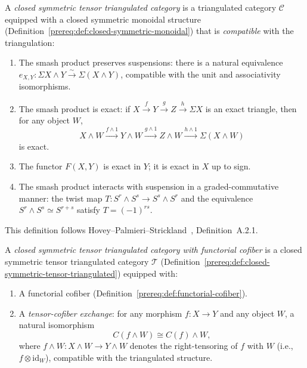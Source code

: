 \begin{definition}\label{prereq:def:closed-symmetric-tensor-triangulated}
    \leanok
    A \emph{closed symmetric tensor triangulated category} is a triangulated category $\mathcal{C}$ equipped with a closed symmetric monoidal structure (Definition~\ref{prereq:def:closed-symmetric-monoidal}) that is \emph{compatible} with the triangulation:
    \begin{enumerate}
        \item The smash product preserves suspensions: there is a natural equivalence $e_{X,Y}: \Sigma X \wedge Y \xrightarrow{\sim} \Sigma(X \wedge Y)$, compatible with the unit and associativity isomorphisms.
        \item The smash product is exact: if $X \xrightarrow{f} Y \xrightarrow{g} Z \xrightarrow{h} \Sigma X$ is an exact triangle, then for any object $W$,
        $$X \wedge W \xrightarrow{f \wedge 1} Y \wedge W \xrightarrow{g \wedge 1} Z \wedge W \xrightarrow{h \wedge 1} \Sigma(X \wedge W)$$
        is exact.
        \item The functor $F(X, Y)$ is exact in $Y$; it is exact in $X$ up to sign.
        \item The smash product interacts with suspension in a graded-commutative manner: the twist map $T: S^r \wedge S^s \to S^s \wedge S^r$ and the equivalence $S^r \wedge S^s \simeq S^{r+s}$ satisfy $T = (-1)^{rs}$.
    \end{enumerate}
    This definition follows Hovey--Palmieri--Strickland~\cite{HPS97}, Definition~A.2.1.
\end{definition}

\begin{definition}\label{prereq:def:tensor-triangulated-functorial-cofiber}
    \leanok
    A \emph{closed symmetric tensor triangulated category with functorial cofiber} is a closed symmetric tensor triangulated category $\mathcal{T}$ (Definition~\ref{prereq:def:closed-symmetric-tensor-triangulated}) equipped with:
    \begin{enumerate}
        \item A functorial cofiber (Definition~\ref{prereq:def:functorial-cofiber}).
        \item A \emph{tensor-cofiber exchange}: for any morphism $f: X \to Y$ and any object $W$, a natural isomorphism
        $$C(f \wedge W) \cong C(f) \wedge W,$$
        where $f \wedge W : X \wedge W \to Y \wedge W$ denotes the right-tensoring of $f$ with $W$ (i.e., $f \otimes \mathrm{id}_W$), compatible with the triangulated structure.
    \end{enumerate}
\end{definition}

